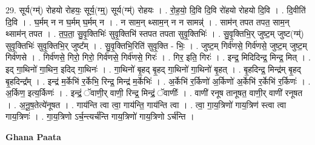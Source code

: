 \documentclass[17pt]{extarticle}
\begin{document}
29. सूर्य(ग्म्॑) रोहयो रोहयः॒ सूर्य॒(ग्म्॒) सूर्य(ग्म्॑) रोहयः । . रो॒ह॒यो॒ दि॒वि दि॒वि रो॑हयो रोहयो दि॒वि । . दि॒वीति॑ दि॒वि । . घ॒र्मम् न न घ॒र्मम् घ॒र्मम् न । . न साम॒न् थ्साम॒न् न न सामन्न्॑ । . साम॑न् तपत तपत॒ साम॒न् थ्साम॑न् तपत । . त॒प॒ता॒ सु॒वृ॒क्तिभिः॑ सुवृ॒क्तिभि॑ स्तपत तपता सुवृ॒क्तिभिः॑ । . सु॒वृ॒क्तिभि॒र् जुष्ट॒म् जुष्ट(ग्म्॑) सुवृ॒क्तिभिः॑ सुवृ॒क्तिभि॒र् जुष्ट᳚म् । . सु॒वृ॒क्तिभि॒रिति॑ सुवृ॒क्ति - भिः॒ । . जुष्ट॒म् गिर्व॑णसे॒ गिर्व॑णसे॒ जुष्ट॒म् जुष्ट॒म् गिर्व॑णसे । . गिर्व॑णसे॒ गिरो॒ गिरो॒ गिर्व॑णसे॒ गिर्व॑णसे॒ गिरः॑ । . गिर॒ इति॒ गिरः॑ । . इन्द्र॒ मिदिदिन्द्र॒ मिन्द्र॒ मित् । . इद् गा॒थिनो॑ गा॒थिन॒ इदिद् गा॒थिनः॑ । . गा॒थिनो॑ बृ॒हद् बृ॒हद् गा॒थिनो॑ गा॒थिनो॑ बृ॒हत् । . बृ॒हदिन्द्र॒ मिन्द्र॑म् बृ॒हद् बृ॒हदिन्द्र᳚म् । . इन्द्र॑ म॒र्केभि॑ र॒र्केभि॒ रिन्द्र॒ मिन्द्र॑ म॒र्केभिः॑ । . अ॒र्केभि॑ र॒र्किणो॑ अ॒र्किणो॑ अ॒र्केभि॑ र॒र्केभि॑ र॒र्किणः॑ । . अ॒र्किण॒ इत्य॒र्किणः॑ । . इन्द्रं॒ ॅवाणी॒र् वाणी॒ रिन्द्र॒ मिन्द्रं॒ ॅवाणीः᳚ । . वाणी॑ रनूष तानूषत॒ वाणी॒र् वाणी॑ रनूषत । . अ॒नू॒ष॒तेत्ये॑नूषत । . गाय॑न्ति त्वा त्वा॒ गाय॑न्ति॒ गाय॑न्ति त्वा । . त्वा॒ गा॒य॒त्रिणो॑ गाय॒त्रिण॑ स्त्वा त्वा गाय॒त्रिणः॑ । . गा॒य॒त्रिणो ऽर्च॒न्त्यर्च॑न्ति गाय॒त्रिणो॑ गाय॒त्रिणो ऽर्च॑न्ति । \newline

\textbf{Ghana Paata } \newline
\end{document}

